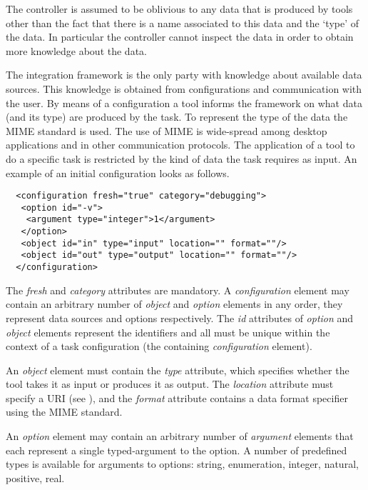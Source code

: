 \documentclass{article}
\begin{document}
   The controller is assumed to be oblivious to any data that is produced by
   tools other than the fact that there is a name associated to this data and
   the `type' of the data.  In particular the controller cannot inspect the
   data in order to obtain more knowledge about the data.

   The integration framework is the only party with knowledge about available
   data sources. This knowledge is obtained from configurations and
   communication with the user. By means of a configuration a tool informs the
   framework on what data (and its type) are produced by the task. To represent
   the type of the data the MIME standard is used. The use of MIME is
   wide-spread among desktop applications and in other communication protocols.
   The application of a tool to do a specific task is restricted by the kind of
   data the task requires as input. An example of an initial configuration
   looks as follows.

   \small \begin{verbatim}
  <configuration fresh="true" category="debugging">
   <option id="-v">
    <argument type="integer">1</argument>
   </option>
   <object id="in" type="input" location="" format=""/>
   <object id="out" type="output" location="" format=""/>
  </configuration>\end{verbatim}
  \normalsize

   \noindent The \textit{fresh} and \textit{category} attributes are mandatory.
   A \textit{configuration} element may contain an arbitrary number of
   \textit{object} and \textit{option} elements in any order, they represent
   data sources and options respectively.  The \textit{id} attributes of
   \textit{option} and \textit{object} elements represent the identifiers and
   all must be unique within the context of a task configuration (the
   containing \textit{configuration} element).

   An \textit{object} element must contain the \textit{type} attribute, which
   specifies whether the tool takes it as input or produces it as output. The
   \textit{location} attribute must specify a URI (see \cite{rfc3305}),
   and the \textit{format} attribute contains a data format specifier
   using the MIME standard.

   An \textit{option} element may contain an arbitrary number of
   \textit{argument} elements that each represent a single typed-argument to
   the option. A number of predefined types is available for arguments to
   options: string, enumeration, integer, natural, positive, real.
\end{document}
